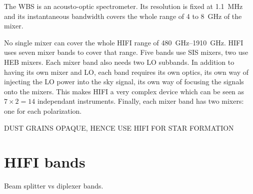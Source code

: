 The WBS is an acousto-optic spectrometer.
Its resolution is fixed at \SI{1.1}{\mega\hertz} and its instantaneous bandwidth covers the whole range of 4 to \SI{8}{\giga\hertz} of the mixer.

No single mixer  can cover the whole HIFI range of \SIrange{480}{1910}{\giga\hertz}.
HIFI uses seven mixer bands to cover that range.
Five bands use SIS mixers, two use HEB mixers.
Each mixer band also needs two LO subbands.
In addition to having its own mixer and LO, each band requires its own optics, its own way of injecting the LO power into the sky signal, its own way of focusing the signals onto the mixers.
This makes HIFI a very complex device which can be seen as $7 \times 2 =14$ independant instruments.
Finally, each mixer band has two mixers: one for each polarization.





DUST GRAINS OPAQUE, HENCE USE HIFI FOR STAR FORMATION


\section{HIFI bands}
\label{sec:hifi_bands}
Beam splitter vs diplexer bands.

